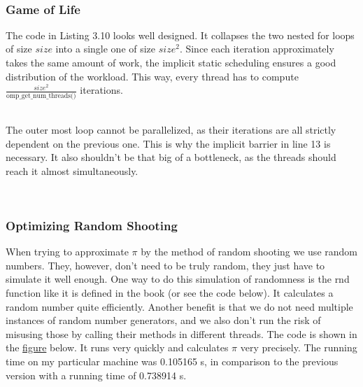 \documentclass[../../main.tex]{subfiles}
\begin{document}
~\\
\subsubsection{Game of Life}
The code in Listing 3.10 looks well designed.
It collapses the two nested for loops of size $size$ into a single one of size $size^2$.
Since each iteration approximately takes the same amount of work, the implicit static scheduling ensures a good distribution of the workload.
This way, every thread has to compute \( \frac{size^2}{\text{omp\_get\_num\_threads()}} \) iterations.

~\\
The outer most loop cannot be parallelized, as their iterations are all strictly dependent on the previous one.
This is why the implicit barrier in line 13 is necessary.
It also shouldn't be that big of a bottleneck, as the threads should reach it almost simultaneously.


~\\
\subsubsection{Optimizing Random Shooting}
When trying to approximate $\pi$ by the method of random shooting we use random numbers.
They, however, don't need to be truly random, they just have to simulate it well enough.
One way to do this simulation of randomness is the rnd function like it is defined in the book (or see the code below).
It calculates a random number quite efficiently.
Another benefit is that we do not need multiple instances of random number generators, and we also don't run the risk of misusing those by calling their methods in different threads.
The code is shown in the \hyperref[fig:calculate_pi_v2]{figure} below.
It runs very quickly and calculates $\pi$ very precisely.
The running time on my particular machine was 0.105165 s, in comparison to the previous version with a running time of 0.738914 s.
\end{document}
